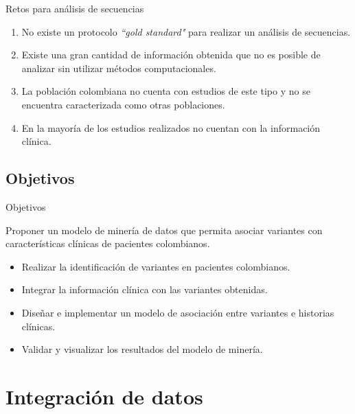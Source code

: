 \documentclass[xcolor=dvipsnames]{beamer}
\begin{document}
\begin{frame}{Retos para análisis de secuencias}

\begin{enumerate}
	\justifying
	\item No existe un protocolo \textit{``gold standard"} para realizar un análisis de secuencias.
	
	\item Existe una gran cantidad de información obtenida que no es posible de analizar sin utilizar métodos computacionales.
	
	\item La población colombiana no cuenta con estudios de este tipo y no se encuentra caracterizada como otras poblaciones.
	
	\item En la mayoría de los estudios realizados no cuentan con la información clínica.
\end{enumerate}

   
\end{frame}

\subsection{Objetivos}

\begin{frame}{Objetivos}
	
	\begin{block}{}
		{\justifying 
			Proponer un modelo de minería de datos que permita asociar variantes con características clínicas de pacientes colombianos.
		}
	\end{block}
	
	\begin{itemize}
		\item Realizar la identificación de variantes en pacientes colombianos.
		\item Integrar la información clínica con las variantes obtenidas.
		\item Diseñar e implementar un modelo de asociación entre variantes e historias clínicas.
		\item Validar y visualizar los resultados del modelo de minería.
	\end{itemize}
		
\end{frame}

\section{Integración de datos}
\end{document}
